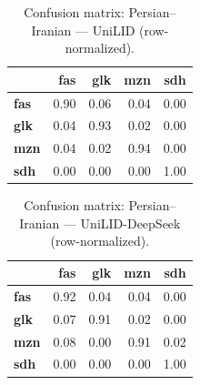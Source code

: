 \begin{table}[htbp]
\centering
\small
\begin{tabular}{lrrrr}
\toprule
 & \textbf{fas} & \textbf{glk} & \textbf{mzn} & \textbf{sdh} \\
\midrule
\textbf{fas} & \cellcolor{blue!90}\color{white}0.90 & \cellcolor{blue!5}0.06 & \cellcolor{blue!4}0.04 & \cellcolor{blue!0}0.00 \\
\textbf{glk} & \cellcolor{blue!4}0.04 & \cellcolor{blue!93}\color{white}0.93 & \cellcolor{blue!2}0.02 & \cellcolor{blue!0}0.00 \\
\textbf{mzn} & \cellcolor{blue!3}0.04 & \cellcolor{blue!1}0.02 & \cellcolor{blue!94}\color{white}0.94 & \cellcolor{blue!0}0.00 \\
\textbf{sdh} & \cellcolor{blue!0}0.00 & \cellcolor{blue!0}0.00 & \cellcolor{blue!0}0.00 & \cellcolor{blue!100}\color{white}1.00 \\
\bottomrule
\end{tabular}
\caption{Confusion matrix: Persian--Iranian — UniLID (row-normalized).}
\label{tab:cm-persian_iranian-unilid}
\end{table}

\begin{table}[htbp]
\centering
\small
\begin{tabular}{lrrrr}
\toprule
 & \textbf{fas} & \textbf{glk} & \textbf{mzn} & \textbf{sdh} \\
\midrule
\textbf{fas} & \cellcolor{blue!91}\color{white}0.92 & \cellcolor{blue!4}0.04 & \cellcolor{blue!4}0.04 & \cellcolor{blue!0}0.00 \\
\textbf{glk} & \cellcolor{blue!6}0.07 & \cellcolor{blue!91}\color{white}0.91 & \cellcolor{blue!2}0.02 & \cellcolor{blue!0}0.00 \\
\textbf{mzn} & \cellcolor{blue!7}0.08 & \cellcolor{blue!0}0.00 & \cellcolor{blue!90}\color{white}0.91 & \cellcolor{blue!1}0.02 \\
\textbf{sdh} & \cellcolor{blue!0}0.00 & \cellcolor{blue!0}0.00 & \cellcolor{blue!0}0.00 & \cellcolor{blue!100}\color{white}1.00 \\
\bottomrule
\end{tabular}
\caption{Confusion matrix: Persian--Iranian — UniLID-DeepSeek (row-normalized).}
\label{tab:cm-persian_iranian-unilid-deepseek}
\end{table}


